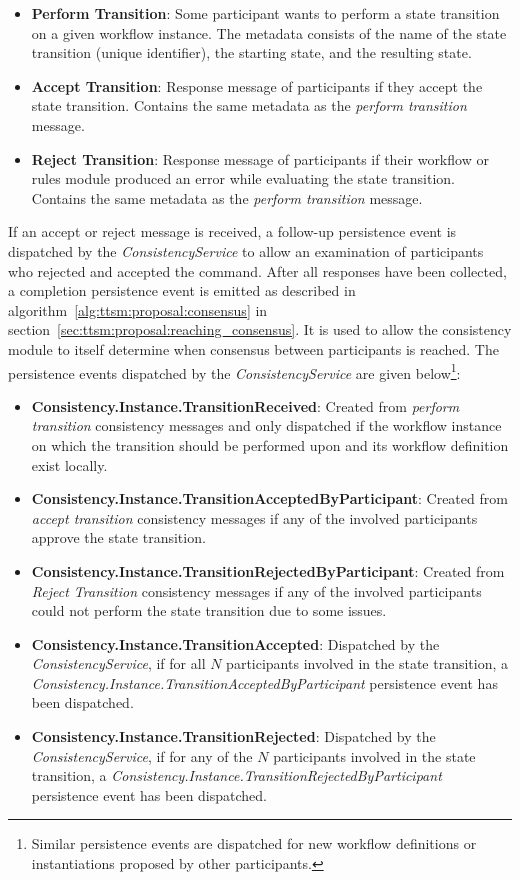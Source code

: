 \begin{itemize}
    \item \textbf{Perform Transition}: Some participant wants to perform a state transition on a given workflow instance. The metadata consists of the name of the state transition (unique identifier), the starting state, and the resulting state.
    \item \textbf{Accept Transition}: Response message of participants if they accept the state transition. Contains the same metadata as the \textit{perform transition} message.
    \item \textbf{Reject Transition}: Response message of participants if their workflow or rules module produced an error while evaluating the state transition. Contains the same metadata as the \textit{perform transition} message.
\end{itemize}

If an accept or reject message is received, a follow-up persistence event is dispatched by the \textit{ConsistencyService} to allow an examination of participants who rejected and accepted the command. After all responses have been collected, a completion persistence event is emitted as described in algorithm~\ref{alg:ttsm:proposal:consensus} in section~\ref{sec:ttsm:proposal:reaching_consensus}. It is used to allow the consistency module to itself determine when consensus between participants is reached. The persistence events dispatched by the \textit{ConsistencyService} are given below\footnote{Similar persistence events are dispatched for new workflow definitions or instantiations proposed by other participants.}:

\begin{itemize}
    \item \textbf{Consistency.Instance.TransitionReceived}: Created from \textit{perform transition} consistency messages and only dispatched if the workflow instance on which the transition should be performed upon and its workflow definition exist locally.
    \item \textbf{Consistency.Instance.TransitionAcceptedByParticipant}: Created from \textit{accept transition} consistency messages if any of the involved participants approve the state transition.
    \item \textbf{Consistency.Instance.TransitionRejectedByParticipant}: Created from \textit{Reject Transition} consistency messages if any of the involved participants could not perform the state transition due to some issues.
    \item \textbf{Consistency.Instance.TransitionAccepted}: Dispatched by the \textit{ConsistencyService}, if for all $N$ participants involved in the state transition, a \textit{Consistency.Instance.TransitionAcceptedByParticipant} persistence event has been dispatched.
    \item \textbf{Consistency.Instance.TransitionRejected}: Dispatched by the \textit{ConsistencyService}, if for any of the $N$ participants involved in the state transition, a \textit{Consistency.Instance.TransitionRejectedByParticipant} persistence event has been dispatched.
\end{itemize}

